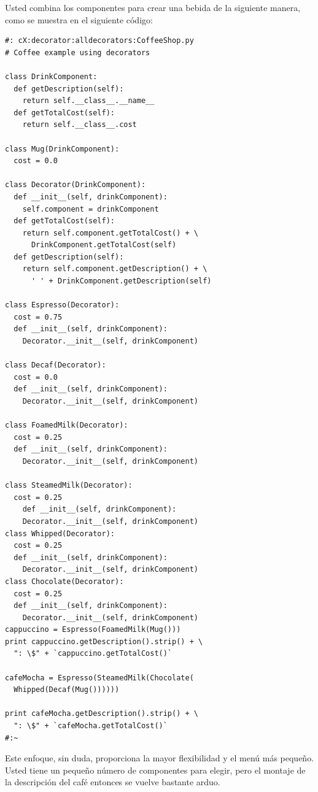\documentclass{article}
\begin{document}
Usted combina los componentes para crear una bebida de la siguiente manera, como se muestra en el siguiente código:     \newline

\begin{lstlisting} 
#: cX:decorator:alldecorators:CoffeeShop.py 
# Coffee example using decorators

class DrinkComponent: 
  def getDescription(self): 
    return self.__class__.__name__ 
  def getTotalCost(self): 
    return self.__class__.cost 
    
class Mug(DrinkComponent): 
  cost = 0.0 
  
class Decorator(DrinkComponent): 
  def __init__(self, drinkComponent): 
    self.component = drinkComponent 
  def getTotalCost(self): 
    return self.component.getTotalCost() + \ 
      DrinkComponent.getTotalCost(self) 
  def getDescription(self): 
    return self.component.getDescription() + \ 
      ' ' + DrinkComponent.getDescription(self) 
      
class Espresso(Decorator): 
  cost = 0.75 
  def __init__(self, drinkComponent): 
    Decorator.__init__(self, drinkComponent) 
    
class Decaf(Decorator): 
  cost = 0.0 
  def __init__(self, drinkComponent): 
    Decorator.__init__(self, drinkComponent) 
    
class FoamedMilk(Decorator): 
  cost = 0.25 
  def __init__(self, drinkComponent): 
    Decorator.__init__(self, drinkComponent) 
    
class SteamedMilk(Decorator): 
  cost = 0.25 
    def __init__(self, drinkComponent): 
    Decorator.__init__(self, drinkComponent) 
class Whipped(Decorator): 
  cost = 0.25 
  def __init__(self, drinkComponent): 
    Decorator.__init__(self, drinkComponent) 
class Chocolate(Decorator): 
  cost = 0.25 
  def __init__(self, drinkComponent): 
    Decorator.__init__(self, drinkComponent) 
cappuccino = Espresso(FoamedMilk(Mug())) 
print cappuccino.getDescription().strip() + \ 
  ": \$" + `cappuccino.getTotalCost()`
  
cafeMocha = Espresso(SteamedMilk(Chocolate( 
  Whipped(Decaf(Mug()))))) 
  
print cafeMocha.getDescription().strip() + \ 
  ": \$" + `cafeMocha.getTotalCost()` 
#:~ 
\end{lstlisting}

Este enfoque, sin duda, proporciona la mayor flexibilidad y el menú más pequeño. Usted tiene un pequeño número de componentes para elegir,  pero el montaje de la descripción del café entonces se vuelve bastante arduo.   \newline
\end{document}
